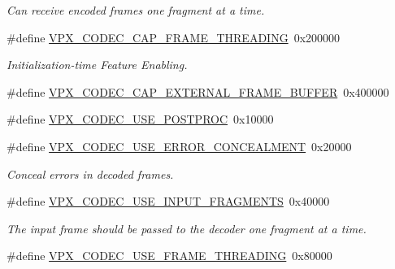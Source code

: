 \begin{DoxyCompactItemize}
\begin{DoxyCompactList}\small\item\em Can receive encoded frames one fragment at a time. \end{DoxyCompactList}\item 
\#define \hyperlink{group__decoder_gaee3981006b67dfdccad895cbef7936e6}{V\+P\+X\+\_\+\+C\+O\+D\+E\+C\+\_\+\+C\+A\+P\+\_\+\+F\+R\+A\+M\+E\+\_\+\+T\+H\+R\+E\+A\+D\+I\+NG}~0x200000
\begin{DoxyCompactList}\small\item\em Initialization-\/time Feature Enabling. \end{DoxyCompactList}\item 
\#define \hyperlink{group__decoder_ga32c2ab619fbb5c575546cc0b623a1a09}{V\+P\+X\+\_\+\+C\+O\+D\+E\+C\+\_\+\+C\+A\+P\+\_\+\+E\+X\+T\+E\+R\+N\+A\+L\+\_\+\+F\+R\+A\+M\+E\+\_\+\+B\+U\+F\+F\+ER}~0x400000
\item 
\#define \hyperlink{group__decoder_ga6fe14f30254aff769412b128b29664cc}{V\+P\+X\+\_\+\+C\+O\+D\+E\+C\+\_\+\+U\+S\+E\+\_\+\+P\+O\+S\+T\+P\+R\+OC}~0x10000
\item 
\#define \hyperlink{group__decoder_ga520d7005e360202f5844982fa2392581}{V\+P\+X\+\_\+\+C\+O\+D\+E\+C\+\_\+\+U\+S\+E\+\_\+\+E\+R\+R\+O\+R\+\_\+\+C\+O\+N\+C\+E\+A\+L\+M\+E\+NT}~0x20000\hypertarget{group__decoder_ga520d7005e360202f5844982fa2392581}{}\label{group__decoder_ga520d7005e360202f5844982fa2392581}

\begin{DoxyCompactList}\small\item\em Conceal errors in decoded frames. \end{DoxyCompactList}\item 
\#define \hyperlink{group__decoder_ga378855a0318396d6e4e585bd3bacbf3f}{V\+P\+X\+\_\+\+C\+O\+D\+E\+C\+\_\+\+U\+S\+E\+\_\+\+I\+N\+P\+U\+T\+\_\+\+F\+R\+A\+G\+M\+E\+N\+TS}~0x40000\hypertarget{group__decoder_ga378855a0318396d6e4e585bd3bacbf3f}{}\label{group__decoder_ga378855a0318396d6e4e585bd3bacbf3f}

\begin{DoxyCompactList}\small\item\em The input frame should be passed to the decoder one fragment at a time. \end{DoxyCompactList}\item 
\#define \hyperlink{group__decoder_ga203295122fe98b675f94f4409d4684e0}{V\+P\+X\+\_\+\+C\+O\+D\+E\+C\+\_\+\+U\+S\+E\+\_\+\+F\+R\+A\+M\+E\+\_\+\+T\+H\+R\+E\+A\+D\+I\+NG}~0x80000\hypertarget{group__decoder_ga203295122fe98b675f94f4409d4684e0}{}\label{group__decoder_ga203295122fe98b675f94f4409d4684e0}


\end{DoxyCompactItemize}
